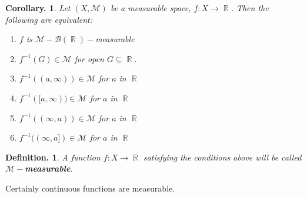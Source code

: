 \documentclass[11pt, a4paper]{memoir}
\DeclareMathOperator{\R}{{\mathbb{R}}}
\theoremstyle{change}
\newtheorem{corollary}[theorem]{Corollary.}
\theoremstyle{plain}
\theoremstyle{nonumberplain}
\newtheorem{definition}{Definition.}
\begin{document}
\begin{corollary}
    Let $(X,\mathcal{M})$ be a measurable space, $f:X\to\R$.
    Then the following are equivalent:
    \begin{enumerate}
        \item $f$ is $\mathcal{M}-\mathcal{B}(\R)-$measurable
        \item $f^{-1}(G)\in\mathcal{M}$ for open $G\subseteq\R$.
        \item $f^{-1}((a,\infty))\in\mathcal{M}$ for $a$ in $\R$
        \item $f^{-1}([a,\infty))\in\mathcal{M}$ for $a$ in $\R$
        \item $f^{-1}((\infty,a))\in\mathcal{M}$ for $a$ in $\R$
        \item $f^{-1}((\infty,a])\in\mathcal{M}$ for $a$ in $\R$ %
    \end{enumerate}
\end{corollary}
\begin{definition}
    A function $f:X\to\R$ satisfying the conditions above will be called $\mathcal{M}-$\textbf{measurable}.
\end{definition}
Certainly continuous functions are measurable.
\end{document}
